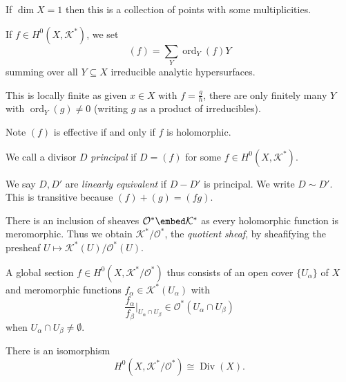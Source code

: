 \documentclass[a4paper]{article}
\DeclareMathOperator{\ord}{ord} %
\DeclareMathOperator{\Div}{Div} %
\begin{document}
\begin{eg}
  If \(\dim X = 1\) then this is a collection of points with some multiplicities.
\end{eg}

\begin{definition}
  If \(f \in H^0(X, \mathcal K^*)\), we set
  \[
    (f) = \sum_Y \ord_Y(f) Y
  \]
  summing over all \(Y \subseteq X\) irreducible analytic hypersurfaces.
\end{definition}
This is locally finite as given \(x \in X\) with \(f = \frac{g}{h}\), there are only finitely many \(Y\) with \(\ord_Y(g) \neq 0\) (writing \(g\) as a product of irreducibles).

Note \((f)\) is effective if and only if \(f\) is holomorphic.

\begin{definition}
  We call a divisor \(D\) \emph{principal} if \(D = (f)\) for some \(f \in H^0(X, \mathcal K^*)\).

  We say \(D, D'\) are \emph{linearly equivalent} if \(D - D'\) is principal. We write \(D \sim D'\). This is transitive because \((f) + (g) = (fg)\).
\end{definition}

There is an inclusion of sheaves \(\mathcal O^* \embed \mathcal K^*\) as every holomorphic function is meromorphic. Thus we obtain \(\mathcal K^*/\mathcal O^*\), the \emph{quotient sheaf}, by sheafifying the presheaf \(U \mapsto \mathcal K^*(U)/\mathcal O^*(U)\).

A global section \(f \in H^0(X, \mathcal K^*/\mathcal O^*)\) thus consists of an open cover \(\{U_\alpha\}\) of \(X\) and meromorphic functions \(f_\alpha \in \mathcal K^*(U_\alpha)\) with
\[
  \frac{f_\alpha}{f_\beta} \Big|_{U_\alpha \cap U_\beta} \in \mathcal O^*(U_\alpha \cap U_\beta)
\]
when \(U_\alpha \cap U_\beta \neq \emptyset\).

\begin{proposition}
  There is an isomorphism
  \[
    H^0(X, \mathcal K^*/\mathcal O^*) \cong \Div(X).
  \]
\end{proposition}
\end{document}
